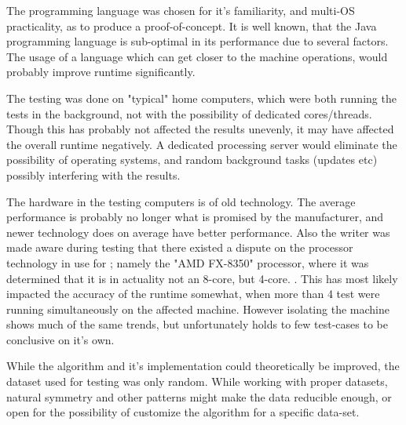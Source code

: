 \documentclass[a4paper]{article}
\begin{document}
The programming language was chosen for it's familiarity, and multi-OS practicality, as to produce a proof-of-concept.
It is well known, that the Java programming language is sub-optimal in its performance due to several
factors. The usage of a language which can get closer to the machine operations, would probably improve
runtime significantly.

The testing was done on "typical" home computers, which were both running the tests in the background, not
with the possibility of dedicated cores/threads. Though this has probably not affected the results unevenly,
it may have affected the overall runtime negatively. A dedicated processing server would eliminate the
possibility of operating systems, and random background tasks (updates etc) possibly
interfering with the results.

The hardware in the testing computers is of old technology. The average performance is probably no longer what
is promised by the manufacturer, and newer technology does on average have better performance. Also the writer
was made aware during testing that there existed a dispute on the processor technology in use for ;
namely the "AMD FX-8350" processor, where it was determined that it is in actuality not an 8-core, but 4-core.
\cite{dickey_v._advanced_micro_devices:inc._2015,dickey_v._advanced_micro_devices:inc._2020,chaim_gartenberg_2019}. This
has most likely impacted the accuracy of the runtime somewhat, when more than 4 test were running simultaneously on
the affected machine. However isolating the machine shows much of the same trends, but unfortunately holds to few test-cases to
be conclusive on it's own.

While the algorithm and it's implementation could theoretically be improved, the dataset used for testing was only
random. While working with proper datasets, natural symmetry and other patterns might make the data reducible enough,
or open for the possibility of customize the algorithm for a specific data-set.




%
%
\newpage

\end{document}
